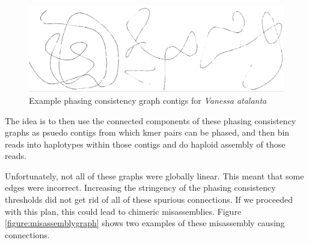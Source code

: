 \begin{figure}[htbp!]
\caption{Example phasing consistency graph contigs for \textit{Vanessa atalanta}}
\label{figure:phasegraph}
\begin{centering}
\includegraphics[width=\textwidth]{phasinggraph.png}
\end{centering}

\end{figure}

\par{
The idea is to then use the connected components of these phasing consistency graphs as psuedo contigs from which kmer pairs can be phased, and then bin reads into haplotypes within those contigs and do haploid assembly of those reads. 

Unfortunately, not all of these graphs were globally linear. This meant that some edges were incorrect. Increasing the stringency of the phasing consistency thresholds did not get rid of all of these spurious connections. If we proceeded with this plan, this could lead to chimeric misassemblies. Figure \ref{figure:misassemblygraph} shows two examples of these misassembly causing connections.
}

